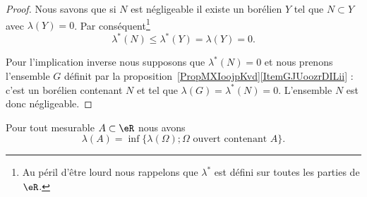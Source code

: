 \begin{proof}
	Nous savons que si \( N\) est négligeable il existe un borélien \( Y\) tel que \( N\subset Y\) avec \( \lambda(Y)=0\). Par conséquent\footnote{Au péril d'être lourd nous rappelons que \( \lambda^*\) est défini sur toutes les parties de \( \eR\).}
	\begin{equation}
		\lambda^*(N)\leq \lambda^*(Y)=\lambda(Y)=0.
	\end{equation}

	Pour l'implication inverse nous supposons que \( \lambda^*(N)=0\) et nous prenons l'ensemble \( G\) définit par la proposition~\ref{PropMXIoojpKvd}\ref{ItemGJUoozrDILii} : c'est un borélien contenant \( N\) et tel que \( \lambda(G)=\lambda^*(N)=0\). L'ensemble \( N\) est donc négligeable.
\end{proof}

\begin{theorem} \label{ThoHFXooONFRN}
	Pour tout mesurable \( A\subset \eR\) nous avons
	\begin{equation}
		\lambda(A)=\inf\{ \lambda(\Omega); \Omega\text{ ouvert contenant } A \}.
	\end{equation}
\end{theorem}

